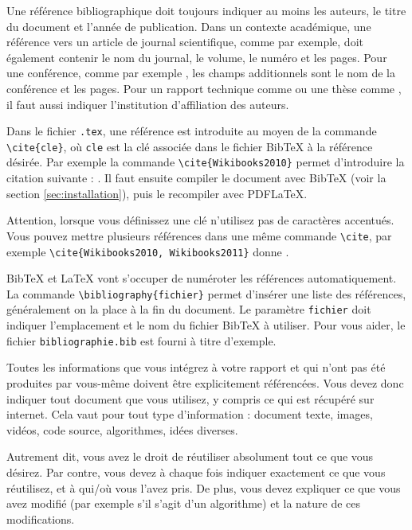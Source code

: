 \documentclass{ASD}
\begin{document}
Une référence bibliographique doit toujours indiquer au moins les auteurs, le titre du document et l'année de publication. Dans un contexte académique, une référence vers un article de journal scientifique, comme \cite{Fortunato2010} par exemple, doit également contenir le nom du journal, le volume, le numéro et les pages. Pour une conférence, comme par exemple \cite{Wei1989}, les champs additionnels sont le nom de la conférence et les pages. Pour un rapport technique comme \cite{Rosvall2009a} ou une thèse comme \cite{Gerbaud2010}, il faut aussi indiquer l'institution d'affiliation des auteurs.

Dans le fichier \texttt{.tex}, une référence est introduite au moyen de la commande \texttt{\textbackslash{}cite\{cle\}}, où \texttt{cle} est la clé associée dans le fichier BibTeX à la référence désirée. Par exemple la commande \texttt{\textbackslash{}cite\{Wikibooks2010\}} permet d'introduire la citation suivante : \cite{Wikibooks2010}. Il faut ensuite compiler le document avec BibTeX (voir la section \ref{sec:installation}), puis le recompiler avec PDFLaTeX.
	
Attention, lorsque vous définissez une clé n'utilisez pas de caractères accentués. Vous pouvez mettre plusieurs références dans une même commande \texttt{\textbackslash{}cite}, par exemple \texttt{\textbackslash{}cite\{Wikibooks2010, Wikibooks2011\}} donne \cite{Wikibooks2010, Wikibooks2011}.
	
BibTeX et \LaTeX{} vont s'occuper de numéroter les références automatiquement. La commande \texttt{\textbackslash{}bibliography\{fichier\}} permet d'insérer une liste des références, généralement on la place à la fin du document. Le paramètre \texttt{fichier} doit indiquer l'emplacement et le nom du fichier BibTeX à utiliser. Pour vous aider, le fichier \texttt{bibliographie.bib} est fourni à titre d'exemple.
	
Toutes les informations que vous intégrez à votre rapport et qui n'ont pas été produites par vous-même doivent être explicitement référencées. Vous devez donc indiquer tout document que vous utilisez, y compris ce qui est récupéré sur internet. Cela vaut pour tout type d'information : document texte, images, vidéos, code source, algorithmes, idées diverses.

Autrement dit, vous avez le droit de réutiliser absolument tout ce que vous désirez. Par contre, vous devez à chaque fois indiquer exactement ce que vous réutilisez, et à qui/où vous l'avez pris. De plus, vous devez expliquer ce que vous avez modifié (par exemple s'il s'agit d'un algorithme) et la nature de ces modifications.
\end{document}
